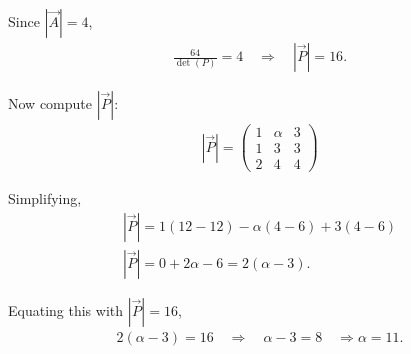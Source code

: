 \documentclass{beamer}
\theoremstyle{remark}
\newcommand{\myvec}[1]{\ensuremath{\begin{pmatrix}#1\end{pmatrix}}}
\numberwithin{equation}{section}
\begin{document}
\begin{frame}
Since $|\Vec{A}| = 4$,
\begin{align}
\frac{64}{\det(P)} = 4 \quad \Rightarrow \quad |\Vec{P}| = 16.
\end{align}

Now compute $|\Vec{P}|$:
\begin{align}
|\Vec{P}| = \myvec{1 & \alpha & 3 \\ 1 & 3 & 3 \\ 2 & 4 & 4}
\end{align}

Simplifying,
\begin{align}
|\Vec{P}| = 1(12 - 12) - \alpha(4 - 6) + 3(4 - 6) \\
|\Vec{P}| = 0 + 2\alpha - 6 = 2(\alpha - 3).
\end{align}

Equating this with $|\Vec{P}| = 16$,
\begin{align}
2(\alpha - 3) = 16 \quad \Rightarrow \quad \alpha - 3 = 8 \quad \Rightarrow \alpha = 11.
\end{align}
\end{frame}
\end{document}
